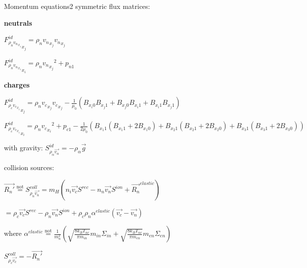 \documentclass{beamer}
\begin{document}
\begin{frame}{Momentum equations2}
symmetric flux matrices:

\textbf{neutrals}

${F_{\rho_{n}{v_n}_{x_i}}^{id}}_{x_j} = \rho_n {v_n}_{x_j} {v_n}_{x_j}  $ 

${F_{\rho_{n}{v_n}_{x_i}}^{id}}_{x_i} = \rho_n {{v_n}_{x_j}}^2 + p_{n1}  $

\textbf{charges}
 
${F_{\rho_{c}{v_c}_{x_i}}^{id}}_{x_j} = \rho_n {v_c}_{x_j} {v_c}_{x_j} - \frac{1}{\mu_0}(B_{x_i 0}B_{x_j 1} + B_{x_j0}B_{x_i1}  + B_{x_i1}B_{x_j1}  ) $ 

${F_{\rho_{c}{v_c}_{x_i}}^{id}}_{x_i} = \rho_n {{v_c}_{x_i}}^2 + p_{c1}  - \frac{1}{2 \mu_0}(B_{x_1 1} (B_{x_1 1} + 2  B_{x_1 0} )+ B_{x_2 1} (B_{x_2 1} + 2  B_{x_2 0} ) + B_{x_3 1} (B_{x_3 1} + 2  B_{x_3 0} ))$

with gravity: $S_{\rho_\alpha \vec{v_\alpha}}^{id} = -\rho_\alpha \vec{g}$

collision sources:

$\vec{R_n'} \stackrel{\text{not}}{=} S_{\rho_n \vec{v_n}}^{coll} =  m_H(n_i \vec{v_c} S^{rec} - n_n \vec{v_n} S^{ion} +\vec{R_n}^{elastic})$

$=\rho_c \vec{v_c} S^{rec} - \rho_n \vec{v_n} S^{ion} +\rho_c \rho_n \alpha^{elastic} (\vec{v_c} - \vec{v_n})$

where $\alpha^{elastic}\stackrel{\text{not}}{=} \frac{1}{m_n^2}(\sqrt{\frac{8 k_B T_{nc}}{\pi m_{in}}} m_{in} \Sigma_{in} +  \sqrt{\frac{8 k_B T_{nc}}{\pi m_{en}}} m_{en} \Sigma_{en})$ 


$S_{\rho_c \vec{v_c}}^{coll} =  -\vec{R_n'} $ 


\end{frame}
\end{document}
